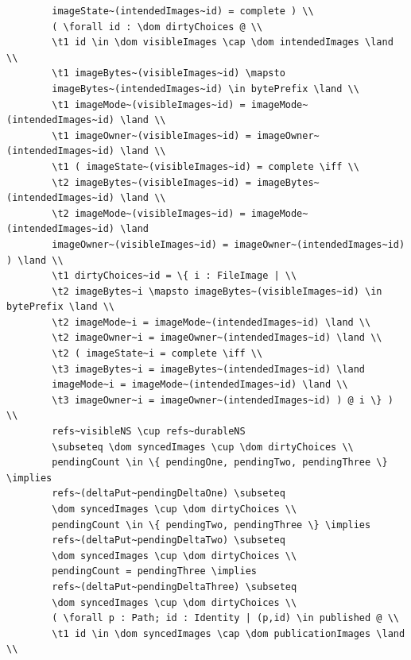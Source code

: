 \documentclass{article}
\begin{document}
\begin{verbatim}
		imageState~(intendedImages~id) = complete ) \\
		( \forall id : \dom dirtyChoices @ \\
		\t1 id \in \dom visibleImages \cap \dom intendedImages \land \\
		\t1 imageBytes~(visibleImages~id) \mapsto
		imageBytes~(intendedImages~id) \in bytePrefix \land \\
		\t1 imageMode~(visibleImages~id) = imageMode~(intendedImages~id) \land \\
		\t1 imageOwner~(visibleImages~id) = imageOwner~(intendedImages~id) \land \\
		\t1 ( imageState~(visibleImages~id) = complete \iff \\
		\t2 imageBytes~(visibleImages~id) = imageBytes~(intendedImages~id) \land \\
		\t2 imageMode~(visibleImages~id) = imageMode~(intendedImages~id) \land
		imageOwner~(visibleImages~id) = imageOwner~(intendedImages~id) ) \land \\
		\t1 dirtyChoices~id = \{ i : FileImage | \\
		\t2 imageBytes~i \mapsto imageBytes~(visibleImages~id) \in bytePrefix \land \\
		\t2 imageMode~i = imageMode~(intendedImages~id) \land \\
		\t2 imageOwner~i = imageOwner~(intendedImages~id) \land \\
		\t2 ( imageState~i = complete \iff \\
		\t3 imageBytes~i = imageBytes~(intendedImages~id) \land
		imageMode~i = imageMode~(intendedImages~id) \land \\
		\t3 imageOwner~i = imageOwner~(intendedImages~id) ) @ i \} ) \\
		refs~visibleNS \cup refs~durableNS
		\subseteq \dom syncedImages \cup \dom dirtyChoices \\
		pendingCount \in \{ pendingOne, pendingTwo, pendingThree \} \implies
		refs~(deltaPut~pendingDeltaOne) \subseteq
		\dom syncedImages \cup \dom dirtyChoices \\
		pendingCount \in \{ pendingTwo, pendingThree \} \implies
		refs~(deltaPut~pendingDeltaTwo) \subseteq
		\dom syncedImages \cup \dom dirtyChoices \\
		pendingCount = pendingThree \implies
		refs~(deltaPut~pendingDeltaThree) \subseteq
		\dom syncedImages \cup \dom dirtyChoices \\
		( \forall p : Path; id : Identity | (p,id) \in published @ \\
		\t1 id \in \dom syncedImages \cap \dom publicationImages \land \\

\end{verbatim}
\end{document}
